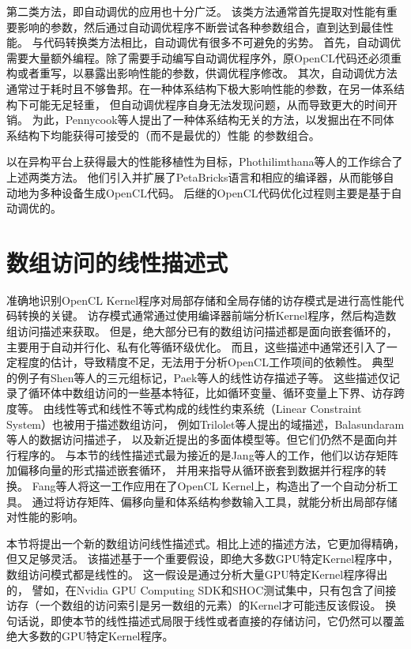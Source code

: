 第二类方法，即自动调优的应用也十分广泛。
该类方法通常首先提取对性能有重要影响的参数，然后通过自动调优程序不断尝试各种参数组合，直到达到最佳性能。
与代码转换类方法相比，自动调优有很多不可避免的劣势。
首先，自动调优需要大量额外编程。除了需要手动编写自动调优程序外，原OpenCL代码还必须重构或者重写，以暴露出影响性能的参数，供调优程序修改。
其次，自动调优方法通常过于耗时且不够鲁邦。在一种体系结构下极大影响性能的参数，在另一体系结构下可能无足轻重，
但自动调优程序自身无法发现问题，从而导致更大的时间开销。
为此，Pennycook等人提出了一种体系结构无关的方法，以发掘出在不同体系结构下均能获得可接受的（而不是最优的）性能
的参数组合。

以在异构平台上获得最大的性能移植性为目标，Phothilimthana等人的工作综合了上述两类方法。
他们引入并扩展了PetaBricks语言和相应的编译器，从而能够自动地为多种设备生成OpenCL代码。
后继的OpenCL代码优化过程则主要是基于自动调优的。

\section{数组访问的线性描述式}
\label{arrayaccessdescriptorsec}
准确地识别OpenCL Kernel程序对局部存储和全局存储的访存模式是进行高性能代码转换的关键。
访存模式通常通过使用编译器前端分析Kernel程序，然后构造数组访问描述来获取。
但是，绝大部分已有的数组访问描述都是面向嵌套循环的，主要用于自动并行化、私有化等循环级优化。
而且，这些描述中通常还引入了一定程度的估计，导致精度不足，无法用于分析OpenCL工作项间的依赖性。
典型的例子有Shen等人的三元组标记，Paek等人的线性访存描述子等。
这些描述仅记录了循环体中数组访问的一些基本特征，比如循环变量、循环变量上下界、访存跨度等。
由线性等式和线性不等式构成的线性约束系统（Linear Constraint System）也被用于描述数组访问，
例如Trilolet等人提出的域描述，Balasundaram等人的数据访问描述子，
以及新近提出的多面体模型等。但它们仍然不是面向并行程序的。
与本节的线性描述式最为接近的是Jang等人的工作，他们以访存矩阵加偏移向量的形式描述嵌套循环，
并用来指导从循环嵌套到数据并行程序的转换。
Fang等人将这一工作应用在了OpenCL Kernel上，构造出了一个自动分析工具。
通过将访存矩阵、偏移向量和体系结构参数输入工具，就能分析出局部存储对性能的影响。

本节将提出一个新的数组访问线性描述式。相比上述的描述方法，它更加得精确，但又足够灵活。
该描述基于一个重要假设，即绝大多数GPU特定Kernel程序中，数组访问模式都是线性的。
这一假设是通过分析大量GPU特定Kernel程序得出的，
譬如，在Nvidia GPU Computing SDK和SHOC测试集中，只有包含了间接访存（一个数组的访问索引是另一数组的元素）的Kernel才可能违反该假设。
换句话说，即使本节的线性描述式局限于线性或者直接的存储访问，它仍然可以覆盖绝大多数的GPU特定Kernel程序。


